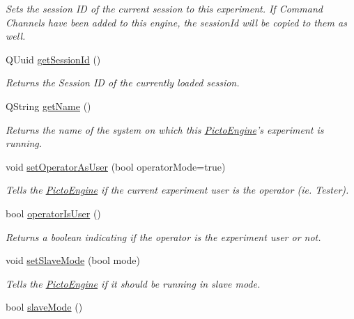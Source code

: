 \begin{DoxyCompactItemize}
\begin{DoxyCompactList}\small\item\em Sets the session I\-D of the current session to this experiment. If Command Channels have been added to this engine, the session\-Id will be copied to them as well. \end{DoxyCompactList}\item 
\hypertarget{class_picto_1_1_engine_1_1_picto_engine_a1b24a0aaaf9e38b8264d64aa5e55be56}{Q\-Uuid \hyperlink{class_picto_1_1_engine_1_1_picto_engine_a1b24a0aaaf9e38b8264d64aa5e55be56}{get\-Session\-Id} ()}\label{class_picto_1_1_engine_1_1_picto_engine_a1b24a0aaaf9e38b8264d64aa5e55be56}

\begin{DoxyCompactList}\small\item\em Returns the Session I\-D of the currently loaded session. \end{DoxyCompactList}\item 
Q\-String \hyperlink{class_picto_1_1_engine_1_1_picto_engine_ab4ebd80f9963c631f1eb6f80c0be8d8f}{get\-Name} ()
\begin{DoxyCompactList}\small\item\em Returns the name of the system on which this \hyperlink{class_picto_1_1_engine_1_1_picto_engine}{Picto\-Engine}'s experiment is running. \end{DoxyCompactList}\item 
void \hyperlink{class_picto_1_1_engine_1_1_picto_engine_a86841564a318281424ddc911b0bae1ea}{set\-Operator\-As\-User} (bool operator\-Mode=true)
\begin{DoxyCompactList}\small\item\em Tells the \hyperlink{class_picto_1_1_engine_1_1_picto_engine}{Picto\-Engine} if the current experiment user is the operator (ie. Tester). \end{DoxyCompactList}\item 
bool \hyperlink{class_picto_1_1_engine_1_1_picto_engine_a9a7d7c0f1f10b7b1efdc0a9456c4dcf7}{operator\-Is\-User} ()
\begin{DoxyCompactList}\small\item\em Returns a boolean indicating if the operator is the experiment user or not. \end{DoxyCompactList}\item 
void \hyperlink{class_picto_1_1_engine_1_1_picto_engine_a8c6c4a72eb295bde8a2fe2667336ba98}{set\-Slave\-Mode} (bool mode)
\begin{DoxyCompactList}\small\item\em Tells the \hyperlink{class_picto_1_1_engine_1_1_picto_engine}{Picto\-Engine} if it should be running in slave mode. \end{DoxyCompactList}\item 
\hypertarget{class_picto_1_1_engine_1_1_picto_engine_adf293c00c501d80fda7f8d4c037ee6b8}{bool \hyperlink{class_picto_1_1_engine_1_1_picto_engine_adf293c00c501d80fda7f8d4c037ee6b8}{slave\-Mode} ()}\label{class_picto_1_1_engine_1_1_picto_engine_adf293c00c501d80fda7f8d4c037ee6b8}


\end{DoxyCompactItemize}
